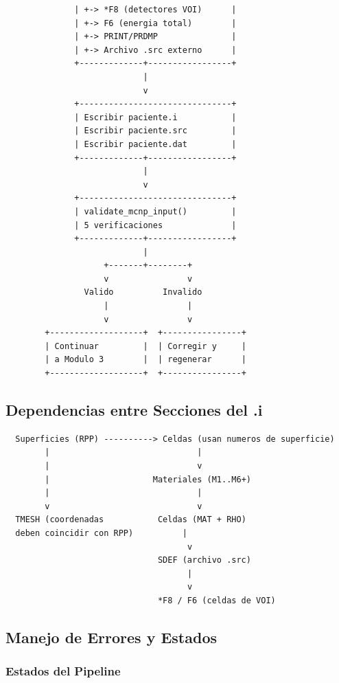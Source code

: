 \documentclass[12pt,a4paper]{article}
\begin{document}
\begin{verbatim}
              | +-> *F8 (detectores VOI)      |
              | +-> F6 (energia total)        |
              | +-> PRINT/PRDMP               |
              | +-> Archivo .src externo      |
              +-------------+-----------------+
                            |
                            v
              +-------------------------------+
              | Escribir paciente.i           |
              | Escribir paciente.src         |
              | Escribir paciente.dat         |
              +-------------+-----------------+
                            |
                            v
              +-------------------------------+
              | validate_mcnp_input()         |
              | 5 verificaciones              |
              +-------------+-----------------+
                            |
                    +-------+--------+
                    v                v
                Valido          Invalido
                    |                |
                    v                v
        +-------------------+  +----------------+
        | Continuar         |  | Corregir y     |
        | a Modulo 3        |  | regenerar      |
        +-------------------+  +----------------+
\end{verbatim}

\subsection{Dependencias entre Secciones del .i}

\begin{verbatim}
  Superficies (RPP) ----------> Celdas (usan numeros de superficie)
        |                              |
        |                              v
        |                     Materiales (M1..M6+)
        |                              |
        v                              v
  TMESH (coordenadas           Celdas (MAT + RHO)
  deben coincidir con RPP)          |
                                     v
                               SDEF (archivo .src)
                                     |
                                     v
                               *F8 / F6 (celdas de VOI)
\end{verbatim}

\subsection{Manejo de Errores y Estados}

\subsubsection{Estados del Pipeline}
\end{document}

